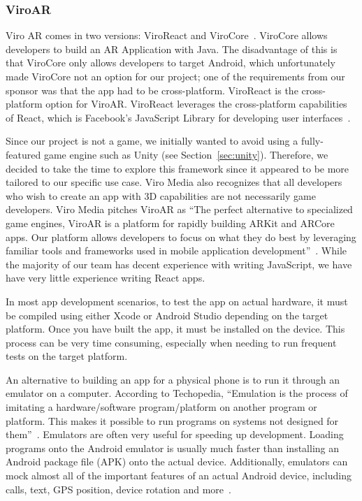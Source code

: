 \documentclass[a4paper, 10pt, american, titlepage]{article}
\begin{document}
\subsubsection{ViroAR}
\label{sec:viroAR}

Viro AR comes in two versions: ViroReact and ViroCore~\autocite{viro2019}.
ViroCore allows developers to build an AR Application with Java. The
disadvantage of this is that ViroCore only allows developers to target Android,
which unfortunately made ViroCore not an option for our project; one of the
requirements from our sponsor was that the app had to be cross-platform.
ViroReact is the cross-platform option for ViroAR. ViroReact leverages the
cross-platform capabilities of React, which is Facebook's JavaScript Library for
developing user interfaces~\autocite{facebook2019}.

Since our project is not a game, we initially wanted to avoid using a
fully-featured game engine such as Unity (see Section~\ref{sec:unity}).
Therefore, we decided to take the time to explore this framework since it
appeared to be more tailored to our specific use case. Viro Media also
recognizes that all developers who wish to create an app with 3D capabilities
are not necessarily game developers. Viro Media pitches ViroAR as ``The
perfect alternative to specialized game engines, ViroAR is a platform for
rapidly building ARKit and ARCore apps. Our platform allows developers to focus
on what they do best by leveraging familiar tools and frameworks used in mobile
application development''~\autocite{viro2019}. While the majority of our team
has decent experience with writing JavaScript, we have have very little
experience writing React apps.

In most app development scenarios, to test the app on actual hardware, it must
be compiled using either Xcode or Android Studio depending on the target
platform. Once you have built the app, it must be installed on the device. This
process can be very time consuming, especially when needing to run frequent
tests on the target platform.

An alternative to building an app for a physical phone is to run it through an
emulator on a computer. According to Techopedia, ``Emulation is the process of
imitating a hardware/software program/platform on another program or platform.
This makes it possible to run programs on systems not designed for
them''~\autocite{techopedia2019}. Emulators are often very useful for speeding
up development. Loading programs onto the Android emulator is usually much
faster than installing an Android package file (APK) onto the actual device.
Additionally, emulators can mock almost all of the important features of an
actual Android device, including calls, text, GPS position, device rotation and
more~\autocite{androidemulator}.
\end{document}
